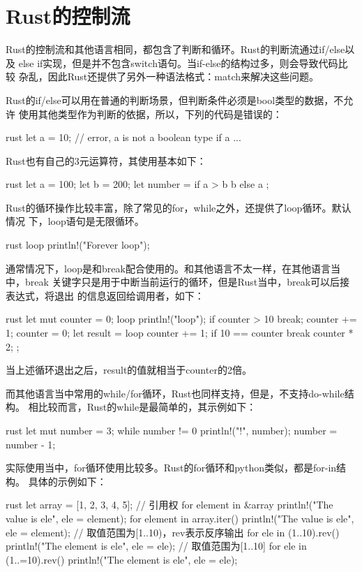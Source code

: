 \section{Rust的控制流}
Rust的控制流和其他语言相同，都包含了判断和循环。Rust的判断流通过if/else以及
else if实现，但是并不包含switch语句。当if-else的结构过多，则会导致代码比较
杂乱，因此Rust还提供了另外一种语法格式：match来解决这些问题。

Rust的if/else可以用在普通的判断场景，但判断条件必须是bool类型的数据，不允许
使用其他类型作为判断的依据，所以，下列的代码是错误的：
\begin{code-block}{rust}
let a = 10;
// error, a is not a boolean type
if a {
    ...
}
\end{code-block}

Rust也有自己的3元运算符，其使用基本如下：
\begin{code-block}{rust}
let a = 100;
let b = 200;
let number = if a > b {
    b
} else {
    a
};

\end{code-block}

Rust的循环操作比较丰富，除了常见的for，while之外，还提供了loop循环。默认情况
下，loop语句是无限循环。
\begin{code-block}{rust}
loop {
    println!("Forever loop");
}
\end{code-block}
通常情况下，loop是和break配合使用的。和其他语言不太一样，在其他语言当中，break
关键字只是用于中断当前运行的循环，但是Rust当中，break可以后接表达式，将退出
的信息返回给调用者，如下：
\begin{code-block}{rust}
let mut counter = 0;
loop {
    println!("loop");
    if counter > 10 {
        break;
    }
    counter += 1;
}
counter = 0;
let result = loop {
    counter += 1;
    if 10 == counter {
        break counter * 2;
    }
};
\end{code-block}
当上述循环退出之后，result的值就相当于counter的2倍。

而其他语言当中常用的while/for循环，Rust也同样支持，但是，不支持do-while结构。
相比较而言，Rust的while是最简单的，其示例如下：
\begin{code-block}{rust}
let mut number = 3;
while number != 0 {
    println!("{}!", number);
    number = number - 1;
}
\end{code-block}
实际使用当中，for循环使用比较多。Rust的for循环和python类似，都是for-in结构。
具体的示例如下：
\begin{code-block}{rust}
let array = [1, 2, 3, 4, 5];
// 引用权
for element in &array {
    println!("The value is {ele}", ele = element);
}
for element in array.iter() {
    println!("The value is {ele}", ele = element);
}
// 取值范围为[1..10)，rev表示反序输出
for ele in (1..10).rev() {
    println!("The element is {ele}", ele = ele);
}
// 取值范围为[1..10]
for ele in (1..=10).rev() {
    println!("The element is {ele}", ele = ele);
}
\end{code-block}

